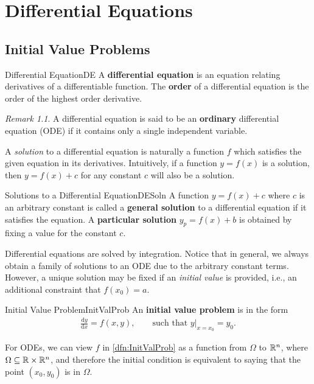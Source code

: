 \documentclass[math, code]{amznotes}
\theoremstyle{remark}
\newtheorem*{remark}{Remark}
\renewcommand{\d}{\mathrm{d}}
\newcommand{\eval}[3]{\left. #1\right\rvert_{#2 = #3}} %
\begin{document}
\tableofcontents

\chapter{Differential Equations}
\section{Initial Value Problems}
\begin{dfnbox}{Differential Equation}{DE}
    A {\color{red} \textbf{differential equation}} is an equation relating derivatives of a differentiable function. The {\color{red} \textbf{order}} of a differential equation is the order of the highest order derivative. 
\end{dfnbox}
\begin{notebox}
    \begin{remark}
        A differential equation is said to be an {\color{red} \textbf{ordinary}} differential equation (ODE) if it contains only a single independent variable.
    \end{remark}
\end{notebox}
A \textit{solution} to a differential equation is naturally a function $f$ which satisfies the given equation in its derivatives. Intuitively, if a function $y = f(x)$ is a solution, then $y = f(x) + c$ for any constant $c$ will also be a solution.
\begin{dfnbox}{Solutions to a Differential Equation}{DESoln}
    A function $y = f(x) + c$ where $c$ is an arbitrary constant is called a {\color{red} \textbf{general solution}} to a differential equation if it satisfies the equation. A {\color{red} \textbf{particular solution}} $y_p = f(x) + b$ is obtained by fixing a value for the constant $c$.
\end{dfnbox}
Differential equations are solved by integration. Notice that in general, we always obtain a family of solutions to an ODE due to the arbitrary constant terms. However, a unique solution may be fixed if an \textit{initial value} is provided, i.e., an additional constraint that $f(x_0) = a$. 
\begin{dfnbox}{Initial Value Problem}{InitValProb}
    An {\color{red} \textbf{initial value problem}} is in the form 
    \begin{align*}
        \frac{\d y}{\d x} = f(x, y), \qquad \textrm{such that } \eval{y}{x}{x_0} = y_0.
    \end{align*}
\end{dfnbox}
For ODEs, we can view $f$ in \ref{dfn:InitValProb} as a function from $\Omega$ to $\mathbb{R}^n$, where $\Omega \subseteq \mathbb{R} \times \mathbb{R}^n$, and therefore the initial condition is equivalent to saying that the point $(x_0, y_0)$ is in $\Omega$.
\end{document}
